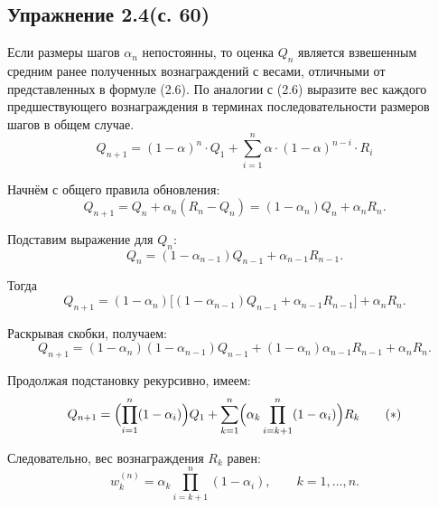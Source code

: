 \subsection{Упражнение 2.4(с. 60)}
Если размеры шагов $\alpha_n$ непостоянны, то оценка $Q_n$ является взвешенным средним ранее полученных вознаграждений с весами, отличными от представленных в формуле (2.6). По аналогии с (2.6) выразите вес каждого предшествующего вознаграждения в терминах последовательности размеров шагов в общем случае. 
\begin{equation}
Q_{n+1} = (1 - \alpha)^n \cdot Q_1 + \sum_{i=1}^{n}\alpha \cdot (1-\alpha)^{n-i} \cdot R_i
\tag{2.6}
\end{equation}
\begin{solution}
    Начнём с общего правила обновления:
\[
Q_{n+1}
= Q_n + \alpha_n (R_n - Q_n)
= (1-\alpha_n) Q_n + \alpha_n R_n .
\]

Подставим выражение для $Q_n$:
\[
Q_n
= (1-\alpha_{n-1}) Q_{n-1} + \alpha_{n-1} R_{n-1}.
\]

Тогда
\[
Q_{n+1}
= (1-\alpha_n)\bigl[(1-\alpha_{n-1}) Q_{n-1}
+ \alpha_{n-1} R_{n-1}\bigr]
+ \alpha_n R_n.
\]

Раскрывая скобки, получаем:
\[
Q_{n+1}
= (1-\alpha_n)(1-\alpha_{n-1}) Q_{n-1}
+ (1-\alpha_n)\alpha_{n-1} R_{n-1}
+ \alpha_n R_n.
\]

Продолжая подстановку рекурсивно, имеем:
\begin{equation}
Q_{n+1}
= \Bigl(\prod_{i=1}^{n} (1-\alpha_i)\Bigr) Q_1
+ \sum_{k=1}^{n}
\Bigl(\alpha_k \prod_{i=k+1}^{n} (1-\alpha_i)\Bigr) R_k
\tag{$*$}
\end{equation}


Следовательно, вес вознаграждения $R_k$ равен:
\[
w_k^{(n)}
= \alpha_k \prod_{i=k+1}^{n} (1-\alpha_i),
\qquad k=1,\dots,n.
\]
\end{solution}

